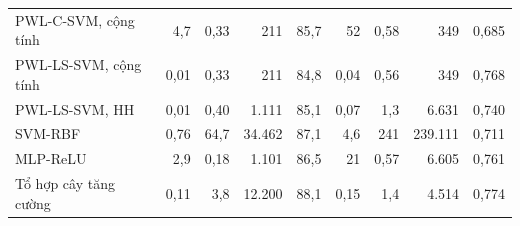\begin{table}[t]
\begin{tabular}{@{}l r r r c r r r c@{}}
PWL-C-SVM, cộng tính & 4{,}7 & 0{,}33 & 211 & 85{,}7 & 52 & 0{,}58 & 349 & 0{,}685\\
PWL-LS-SVM, cộng tính & 0{,}01 & 0{,}33 & 211 & 84{,}8 & 0{,}04 & 0{,}56 & 349 & 0{,}768\\
PWL-LS-SVM, HH & 0{,}01 & 0{,}40 & 1.111 & 85{,}1 & 0{,}07 & 1{,}3 & 6.631 & 0{,}740\\
SVM-RBF & 0{,}76 & 64{,}7 & 34.462 & 87{,}1 & 4{,}6 & 241 & 239.111 & 0{,}711\\
MLP-ReLU & 2{,}9 & 0{,}18 & 1.101 & 86{,}5 & 21 & 0{,}57 & 6.605 & 0{,}761\\
Tổ hợp cây tăng cường & 0{,}11 & 3{,}8 & 12.200 & 88{,}1 & 0{,}15 & 1{,}4 & 4.514 & 0{,}774\\
\bottomrule
\end{tabular}
\end{table}
